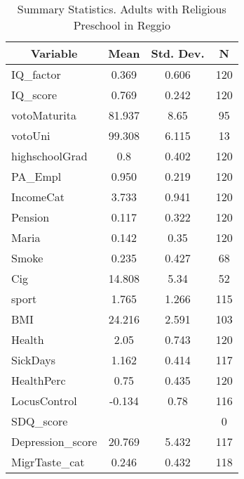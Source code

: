 
\begin{table}[htbp]\centering \caption{Summary Statistics. Adults with Religious Preschool in Reggio \label{bothAdultmaternaReliReggio}}
\begin{tabular}{l c c  c}\hline\hline
\multicolumn{1}{c}{\textbf{Variable}} & \textbf{Mean}
 & \textbf{Std. Dev.} & \textbf{N}\\ \hline
IQ\_factor & 0.369 & 0.606  & 120\\
IQ\_score & 0.769 & 0.242  & 120\\
votoMaturita & 81.937 & 8.65  & 95\\
votoUni & 99.308 & 6.115  & 13\\
highschoolGrad & 0.8 & 0.402  & 120\\
PA\_Empl & 0.950 & 0.219  & 120\\
IncomeCat & 3.733 & 0.941  & 120\\
Pension & 0.117 & 0.322  & 120\\
Maria & 0.142 & 0.35  & 120\\
Smoke & 0.235 & 0.427  & 68\\
Cig & 14.808 & 5.34  & 52\\
sport & 1.765 & 1.266  & 115\\
BMI & 24.216 & 2.591  & 103\\
Health & 2.05 & 0.743  & 120\\
SickDays & 1.162 & 0.414  & 117\\
HealthPerc & 0.75 & 0.435  & 120\\
LocusControl & -0.134 & 0.78  & 116\\
SDQ\_score &  &   & 0\\
Depression\_score & 20.769 & 5.432  & 117\\
MigrTaste\_cat & 0.246 & 0.432  & 118\\
\hline\end{tabular}
\end{table}
